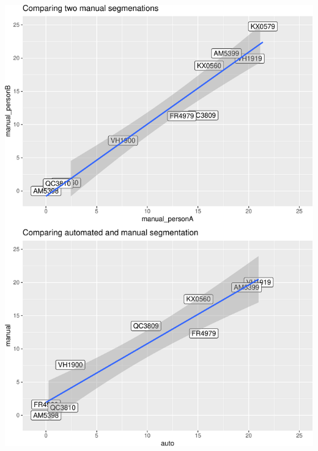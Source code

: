 \documentclass[
]{article}
\begin{document}
\includegraphics{paper_files/figure-latex/plot_all-1.pdf}
\end{document}
